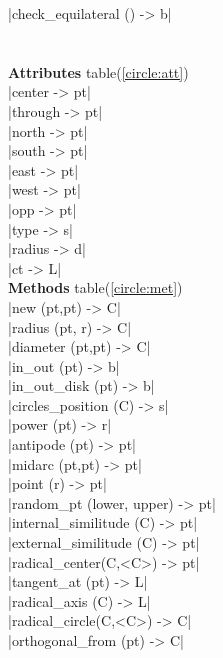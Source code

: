 \documentclass[DIV         = 14,
               fontsize    = 10,
               index       = totoc,
               twoside,
               cadre,
               headings    = small
               ]{tkz-doc}
\begin{document}
\begin{multicols}{3}
|check_equilateral ()      -> b|   \\
                                    \\
             \\
\textbf{Attributes} table(\ref{circle:att}) \\
|center                    -> pt|  \\
|through                   -> pt|  \\
|north                     -> pt|  \\
|south                     -> pt|  \\
|east                      -> pt|  \\
|west                      -> pt|  \\
|opp                       -> pt|  \\
|type                      -> s|   \\
|radius                    -> d|   \\
|ct                        -> L|   \\ 
\textbf{Methods} table(\ref{circle:met})  \\
|new (pt,pt)               -> C|   \\
|radius (pt, r)            -> C|   \\
|diameter (pt,pt)          -> C|   \\       
|in_out (pt)               -> b|   \\     
|in_out_disk (pt)          -> b|   \\     
|circles_position (C)      -> s|   \\     
|power (pt)                -> r|   \\     
|antipode (pt)             -> pt|  \\     
|midarc (pt,pt)            -> pt|  \\     
|point (r)                 -> pt|  \\     
|random_pt (lower, upper)  -> pt|  \\     
|internal_similitude (C)   -> pt|  \\     
|external_similitude (C)   -> pt|  \\       
|radical_center(C,<C>)     -> pt|  \\
|tangent_at (pt)           -> L|   \\     
|radical_axis (C)          -> L|   \\     
|radical_circle(C,<C>)     -> C|   \\     
|orthogonal_from (pt)      -> C|   \\     

\end{multicols}
\end{document}
